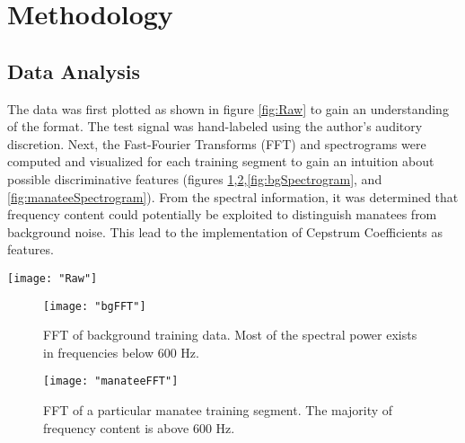 \documentclass[conference]{IEEEtran}
\begin{document}
\section{Methodology} \label{Methodology}

	\subsection{Data Analysis}
	
	The data was first plotted as shown in figure \ref{fig:Raw} to gain an understanding of the format.  The test signal was hand-labeled using the author's auditory discretion.  Next, the Fast-Fourier Transforms (FFT) and spectrograms were computed and visualized for each training segment to gain an intuition about possible discriminative features (figures \ref{fig:bgFFT},\ref{fig:manateeFFT},\ref{fig:bgSpectrogram}, and \ref{fig:manateeSpectrogram}).  From the spectral information, it was determined that frequency content could potentially be exploited to distinguish manatees from background noise.  This lead to the implementation of Cepstrum Coefficients as features. 
	
	\begin{center}
		\begin{figure*}[h]
			\centering
			\texttt{[image: "Raw"]}
			\caption{Raw audio signals. Top: Training segments of 10 unique manatee categories.  Middle: Raw training data for background noise.  Bottom: Raw test signal colored by hand-created labels.  Red portions signify segments from 16 unique manatee observations, while blue represents background noise.}
			\label{fig:Raw}
		\end{figure*}
	\end{center}
	
	\begin{center}
		\begin{figure}[h]
			\centering
			\texttt{[image: "bgFFT"]}
			\caption{FFT of background training data.  Most of the spectral power exists in frequencies below 600 Hz.}
			\label{fig:bgFFT}
		\end{figure}
	\end{center}
\begin{center}
	\begin{figure}[h]
		\centering
		\texttt{[image: "manateeFFT"]}
		\caption{FFT of a particular manatee training segment.  The majority of frequency content is above 600 Hz.}
		\label{fig:manateeFFT}
	\end{figure}
\end{center}
\end{document}

